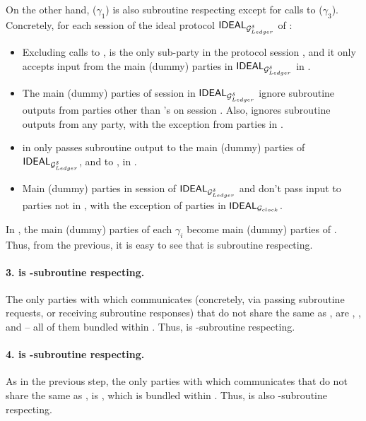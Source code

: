 On the other hand, \IdealGdledger ($\gamma_1$) is also subroutine respecting
except for calls to \IdealGclock ($\gamma_3$). Concretely, for each session
of the ideal protocol $\mathsf{IDEAL}_{\mathcal{G}_{Ledger}^\delta}$ of \IdealGdledger:

\begin{itemize}
\item Excluding calls to \IdealGclock, \IdealGdledger is the only sub-party in
  the protocol session \sid, and it only accepts input from the main (dummy)
  parties in $\mathsf{IDEAL}_{\mathcal{G}_{Ledger}^\delta}$ in \sid.
\item The main (dummy) parties of session \sid in $\mathsf{IDEAL}_{\mathcal{G}_{Ledger}^\delta}$
  ignore subroutine outputs from parties other than \IdealGdledger's on
  session \sid. Also, \IdealGdledger ignores subroutine outputs from any
  party, with the exception from parties in \IdealGclock.
\item \IdealGdledger in \sid only passes subroutine output to the main (dummy)
  parties of $\mathsf{IDEAL}_{\mathcal{G}_{Ledger}^\delta}$, and to \IdealGclock, in \sid.
\item Main (dummy) parties in session \sid of $\mathsf{IDEAL}_{\mathcal{G}_{Ledger}^\delta}$ and
  \IdealGdledger don't pass input to parties not in \sid, with the exception
  of parties in $\mathsf{IDEAL}_{\mathcal{G}_{clock}}$.
\end{itemize}

In \gAtala, the main (dummy) parties of each $\gamma_i$ become main (dummy)
parties of \gAtala. Thus, from the previous, it is easy to see that \gAtala is
subroutine respecting. 

\paragraph{3. \RealPKIDIDAtala is \gAtala-subroutine respecting.}
The only parties with which \RealPKIDIDAtala communicates (concretely, via
passing subroutine requests, or receiving subroutine responses) that do not
share the same \sid as \RealPKIDIDAtala, are \IdealGclock, \IdealGRO, and
\IdealGdledger -- all of them bundled within \gAtala. Thus, \RealPKIDIDAtala is
\gAtala-subroutine respecting.

\paragraph{4. \IdealGPKIDID is \gAtala-subroutine respecting.}
As in the previous step, the only parties with which \IdealGPKIDID communicates
that do not share the same \sid as \IdealGPKIDID, is \IdealGclock, which is
bundled within \gAtala. Thus, \IdealGPKIDID is also \gAtala-subroutine
respecting.

